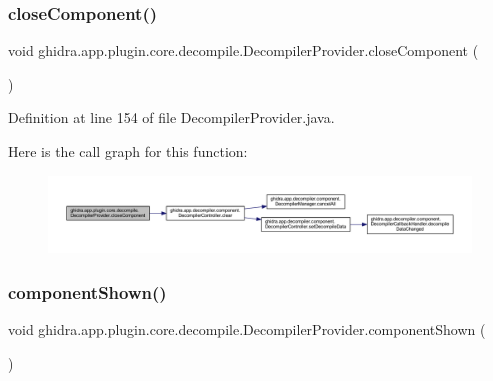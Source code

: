 \subsubsection{\texorpdfstring{closeComponent()}{closeComponent()}}
{\footnotesize\ttfamily void ghidra.\+app.\+plugin.\+core.\+decompile.\+Decompiler\+Provider.\+close\+Component (\begin{DoxyParamCaption}{ }\end{DoxyParamCaption})\hspace{0.3cm}{\ttfamily [inline]}}



Definition at line 154 of file Decompiler\+Provider.\+java.

Here is the call graph for this function\+:
\nopagebreak
\begin{figure}[H]
\begin{center}
\leavevmode
\includegraphics[width=350pt]{classghidra_1_1app_1_1plugin_1_1core_1_1decompile_1_1_decompiler_provider_a0e2fcd2b85d7ae6fe189998b4bcdd984_cgraph}
\end{center}
\end{figure}
\mbox{\label{classghidra_1_1app_1_1plugin_1_1core_1_1decompile_1_1_decompiler_provider_ad7dcdde0bae93b40f4d6acca9f90a139}} 
\subsubsection{\texorpdfstring{componentShown()}{componentShown()}}
{\footnotesize\ttfamily void ghidra.\+app.\+plugin.\+core.\+decompile.\+Decompiler\+Provider.\+component\+Shown (\begin{DoxyParamCaption}{ }\end{DoxyParamCaption})\hspace{0.3cm}{\ttfamily [inline]}}



